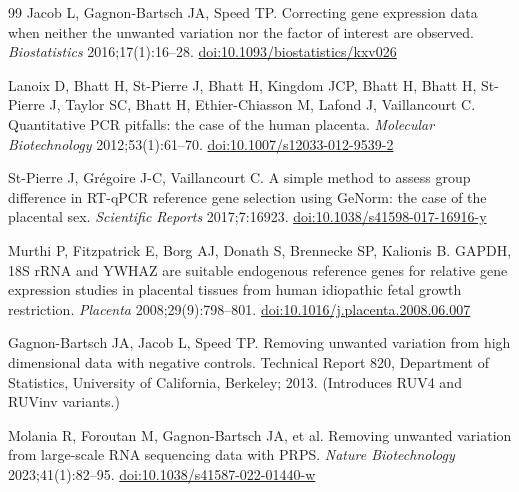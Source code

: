 \documentclass[11pt,a4paper]{article}
\newcommand{\doi}[1]{\href{https://doi.org/#1}{doi:#1}}
\begin{document}
\begin{thebibliography}{99}
Jacob L, Gagnon-Bartsch JA, Speed TP.
Correcting gene expression data when neither the unwanted
variation nor the factor of interest are observed.
\textit{Biostatistics} 2016;17(1):16--28.
\doi{10.1093/biostatistics/kxv026}

Lanoix D, Bhatt H, St-Pierre J, Bhatt H, Kingdom JCP, Bhatt H,
Bhatt H, St-Pierre J, Taylor SC, Bhatt H, Ethier-Chiasson M,
Lafond J, Vaillancourt C.
Quantitative PCR pitfalls: the case of the human placenta.
\textit{Molecular Biotechnology} 2012;53(1):61--70.
\doi{10.1007/s12033-012-9539-2}

St-Pierre J, Gr\'egoire J-C, Vaillancourt C.
A simple method to assess group difference in RT-qPCR reference
gene selection using GeNorm: the case of the placental sex.
\textit{Scientific Reports} 2017;7:16923.
\doi{10.1038/s41598-017-16916-y}

Murthi P, Fitzpatrick E, Borg AJ, Donath S, Brennecke SP,
Kalionis B.
GAPDH, 18S rRNA and YWHAZ are suitable endogenous reference genes
for relative gene expression studies in placental tissues from
human idiopathic fetal growth restriction.
\textit{Placenta} 2008;29(9):798--801.
\doi{10.1016/j.placenta.2008.06.007}

Gagnon-Bartsch JA, Jacob L, Speed TP.
Removing unwanted variation from high dimensional data with
negative controls.
Technical Report 820, Department of Statistics, University of
California, Berkeley; 2013.
(Introduces RUV4 and RUVinv variants.)

Molania R, Foroutan M, Gagnon-Bartsch JA, et al.
Removing unwanted variation from large-scale RNA sequencing data
with PRPS.
\textit{Nature Biotechnology} 2023;41(1):82--95.
\doi{10.1038/s41587-022-01440-w}

\end{thebibliography}
\end{document}
